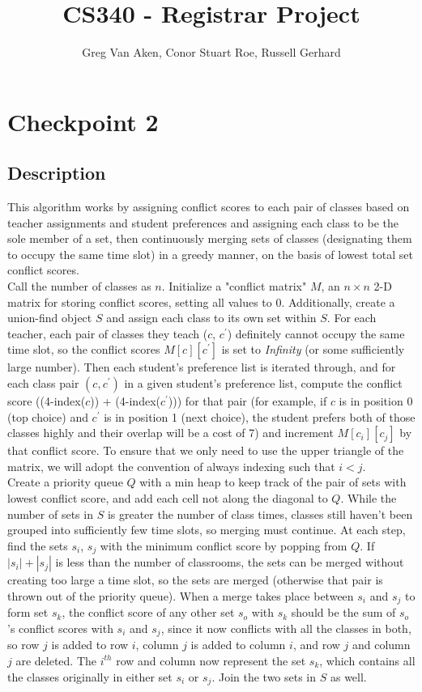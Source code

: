 \documentclass[11pt, oneside]{article}   	%
\title{CS340 - Registrar Project}
\author{Greg Van Aken, Conor Stuart Roe, Russell Gerhard}
\begin{document}
\maketitle

\section{Checkpoint 2}
\subsection{Description}
This algorithm works by assigning conflict scores to each pair of classes based on teacher assignments and student preferences and assigning each class to be the sole member of a set, then continuously merging sets of classes (designating them to occupy the same time slot) in a greedy manner, on the basis of lowest total set conflict scores. \\

Call the number of classes as $n$. Initialize a "conflict matrix" $M$, an $n \times n$ 2-D matrix for storing conflict scores, setting all values to 0. Additionally, create a union-find object $S$ and assign each class to its own set within $S$. For each teacher, each pair of classes they teach ($c$, $c^\prime$) definitely cannot occupy the same time slot, so the conflict scores $M[c][c^\prime]$ is set to {\it Infinity} (or some sufficiently large number). Then each student's preference list is iterated through, and for each class pair $(c, c^\prime)$ in a given student's preference list, compute the conflict score ((4-index($c$)) + (4-index($c^\prime$))) for that pair (for example, if $c$ is in position 0 (top choice) and $c^\prime$ is in position 1 (next choice), the student prefers both of those classes highly and their overlap will be a cost of 7) and increment $M[c_i][c_j]$  by that conflict score. To ensure that we only need to use the upper triangle of the matrix, we will adopt the convention of always indexing such that $i < j$. \\

Create a priority queue $Q$ with a min heap to keep track of the pair of sets with lowest conflict score, and add each cell not along the diagonal to $Q$. While the number of sets in $S$ is greater the number of class times, classes still haven't been grouped into sufficiently few time slots, so merging must continue. At each step, find the sets $s_i$, $s_j$ with the minimum conflict score by popping from $Q$. If $|s_i| + |s_j|$ is less than the number of classrooms, the sets can be merged without creating too large a time slot, so the sets are merged (otherwise that pair is thrown out of the priority queue). When a merge takes place between $s_i$ and $s_j$ to form set $s_k$, the conflict score of any other set $s_o$ with $s_k$ should be the sum of $s_o$'s conflict scores with $s_i$ and $s_j$, since it now conflicts with all the classes in both, so row $j$ is added to row $i$, column $j$ is added to column $i$, and row $j$ and column $j$ are deleted. The $i^{th}$ row and column now represent the set $s_k$, which contains all the classes originally in either set $s_i$ or $s_j$. Join the two sets in $S$ as well.
\end{document}

